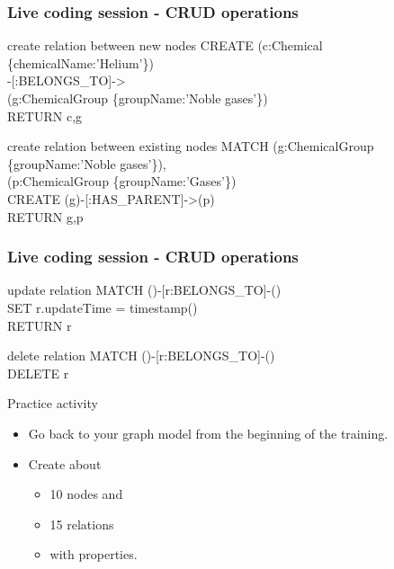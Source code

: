 \documentclass[12pt]{beamer}
\begin{document}
    \begin{frame}
        \frametitle{Live coding session - CRUD operations}
        \begin{block}{create relation between new nodes}
            CREATE (c:Chemical \{chemicalName:'Helium'\})\\
            \hspace{1cm} -[:BELONGS\_TO]-\textgreater\\
            \hspace{1cm} (g:ChemicalGroup \{groupName:'Noble gases'\})\\ 
            RETURN c,g
        \end{block}
        \begin{block}{create relation between existing nodes}
            MATCH (g:ChemicalGroup \{groupName:'Noble gases'\}),\\
            \hspace{1.4cm} (p:ChemicalGroup \{groupName:'Gases'\})\\
            CREATE (g)-[:HAS\_PARENT]-\textgreater(p)\\ 
            RETURN g,p
        \end{block}
    \end{frame}
    
    \begin{frame}
        \frametitle{Live coding session - CRUD operations}
        \begin{block}{update relation}
            MATCH ()-[r:BELONGS\_TO]-()\\
            \hspace{1cm} SET r.updateTime = timestamp()\\
            \hspace{1cm} RETURN r
        \end{block}
        \begin{block}{delete relation}
            MATCH ()-[r:BELONGS\_TO]-()\\
            \hspace{1cm} DELETE r
        \end{block}
    \end{frame}
    
    \begin{frame}{Practice activity}
        \begin{itemize}
            \item Go back to your graph model from the beginning of the training.
            \item Create about
            \begin{itemize}
                \item 10 nodes and
                \item 15 relations
                \item with properties.
            \end{itemize}
        \end{itemize}
    \end{frame}
    
\end{document}
